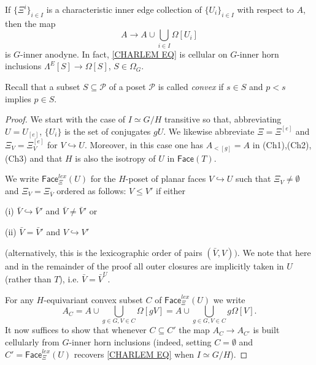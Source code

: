\documentclass[a4paper,10pt
,draft
]{article}%
\begin{document}
\begin{lemma}\label{CHAREDGE LEM}
If $\{\Xi^i\}_{i \in I}$ is a characteristic inner edge collection of $\{U_i\}_{i\in I}$ with respect to $A$, then the map
	\begin{equation}\label{CHARLEM EQ}
		A \to A \cup \bigcup_{i \in I} \Omega[U_i]
	\end{equation}
is $G$-inner anodyne. 
In fact, \eqref{CHARLEM EQ} is cellular on $G$-inner horn inclusions $\Lambda^E[S] \to \Omega[S]$, $S \in \Omega_G$.
\end{lemma}

Recall that a subset $S \subseteq \mathcal{P}$ of a poset $\mathcal{P}$ is called \textit{convex} if $s \in S$ and 
$p<s$ implies $p \in S$.

\begin{proof}
We start with the case of $I \simeq G/H$ transitive so that, abbreviating $U = U_{[e]}$, $\{U_i\}$ is the set of conjugates $gU$. 
We likewise abbreviate $\Xi = \Xi^{[e]}$ and
$\Xi_V = \Xi_V^{[e]}$ for $V \hookrightarrow U$.
Moreover, in this case one has $A_{<[g]}=A$ in (Ch1),(Ch2),(Ch3) and that $H$ is also the isotropy of $U$ in $\mathsf{Face}(T)$.

We write $\mathsf{Face}_{\Xi}^{lex}(U)$
for the $H$-poset of planar faces $V \hookrightarrow U$
such that $\Xi_V \neq \emptyset$ and $\Xi_V = \Xi_{\bar{V}}$
ordered as follows: 
$V \leq V'$ if either
	\begin{inparaenum}
		\item[(i)] $\bar{V} \hookrightarrow \bar{V}'$ and 
		$\bar{V} \neq \bar{V}'$ or
		\item[(ii)] $\bar{V} = \bar{V}'$ and
		$V \hookrightarrow V'$
	\end{inparaenum}
(alternatively, this is the lexicographic order of pairs $(\bar{V},V))$.
We note that here and in the remainder of the proof all outer closures are implicitly taken in $U$ (rather than $T$), i.e. 
$\bar{V}=\bar{V}^U$.

For any $H$-equivariant convex subset $C$ of $\mathsf{Face}_{\Xi}^{lex}(U)$ we write
\[
A_C = 
A \cup \bigcup_{g\in G,V \in C} \Omega[gV]= 
A \cup \bigcup_{g\in G,V \in C} g \Omega[V].
\]
It now suffices to show that whenever
$C \subseteq C'$
the map 
$A_C \to A_{C'}$ is built cellularly from 
$G$-inner horn inclusions
(indeed, setting $C=\emptyset$ and 
$C'=\mathsf{Face}_{\Xi}^{lex}(U)$ recovers \eqref{CHARLEM EQ}
when $I \simeq G/H$).


\end{proof}
\end{document}
